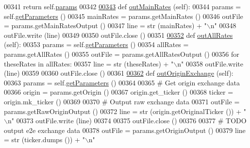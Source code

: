 \begin{DoxyCode}
{00341         \textcolor{keywordflow}{return} self.\hyperlink{classe2e_1_1_application_a57206c6ccc86c2659edfd8d73d2029f3}{params}
00342             
\hypertarget{e2e_8py_source.tex_l00343}{}\hyperlink{classe2e_1_1_application_a3e33fd00d85637393d48ea3f7dbd95c7}{00343}     \textcolor{keyword}{def }\hyperlink{classe2e_1_1_application_a3e33fd00d85637393d48ea3f7dbd95c7}{outMainRates} (self):
00344         params = self.\hyperlink{classe2e_1_1_application_ae7bc7b58f19d681635cfa8ae06d9769b}{getParameters} ()
00345         mainRates = params.getMainRates ()
00346         outFile = params.getMainRatesOutput ()
00347         line = str (mainRates) + \textcolor{stringliteral}{"\(\backslash\)n"}
00348         outFile.write (line)
00349         
00350         outFile.close ()
00351     
\hypertarget{e2e_8py_source.tex_l00352}{}\hyperlink{classe2e_1_1_application_acd7798aa633d75001b6f6fde556b8a51}{00352}     \textcolor{keyword}{def }\hyperlink{classe2e_1_1_application_acd7798aa633d75001b6f6fde556b8a51}{outAllRates} (self):
00353         params = self.\hyperlink{classe2e_1_1_application_ae7bc7b58f19d681635cfa8ae06d9769b}{getParameters} ()
00354         allRates = params.getAllRates ()
00355         outFile = params.getAllRatesOutput ()
00356         \textcolor{keywordflow}{for} theseRates \textcolor{keywordflow}{in} allRates:
00357             line = str (theseRates) + \textcolor{stringliteral}{"\(\backslash\)n"}
00358             outFile.write (line)
00359         
00360         outFile.close ()
00361     
\hypertarget{e2e_8py_source.tex_l00362}{}\hyperlink{classe2e_1_1_application_adfad90d64cddb8d751961202264ca489}{00362}     \textcolor{keyword}{def }\hyperlink{classe2e_1_1_application_adfad90d64cddb8d751961202264ca489}{outOriginExchange} (self):
00363         params = self.\hyperlink{classe2e_1_1_application_ae7bc7b58f19d681635cfa8ae06d9769b}{getParameters} ()
00364         
00365         \textcolor{comment}{# Get origin exchange data}
00366         origin = params.getOrigin ()
00367         origin.get\_ticker ()
00368         ticker = origin.mk\_ticker ()
00369 
00370         \textcolor{comment}{# Output raw exchange data}
00371         outFile = params.getRawOriginOutput ()
00372         line = str (origin.getOriginalTicker ()) + \textcolor{stringliteral}{"\(\backslash\)n"}
00373         outFile.write (line)
00374         
00375         outFile.close ()
00376     
00377         \textcolor{comment}{# TODO output e2e exchange data}
00378         outFile = params.getOriginOutput ()
00379         line = str (ticker.dumps ()) + \textcolor{stringliteral}{"\(\backslash\)n"}
}
\end{DoxyCode}
